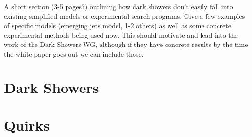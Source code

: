 A short section (3-5 pages?) outlining how dark showers don't easily fall into existing simplified models or experimental search programs. Give a few examples of specific models (emerging jets model, 1-2 others) as well as some concrete experimental methods being used now. This should motivate and lead into the work of the Dark Showers WG, although if they have concrete results by the time the white paper goes out we can include those.

\section{Dark Showers}
\section{Quirks}